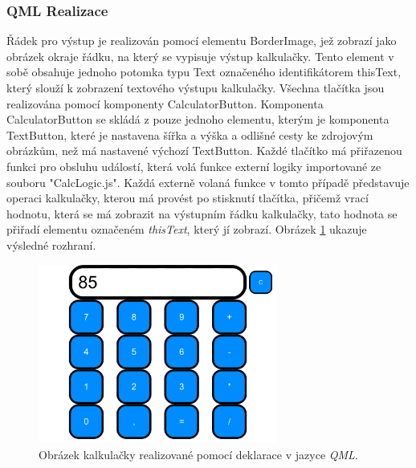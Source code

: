 \documentclass[11pt,twoside,a4paper]{book}
\begin{document}
{{\begin{ttemize}
{{\begin{lastlisting}[frame=single,caption=Řešení v pseudokódu problematického použití operátoru "." v přiřazovacím výroku,label=lst:var0N]
\subsubsection{QML Realizace}
Řádek pro výstup je realizován pomocí elementu BorderImage, jež zobrazí jako obrázek okraje řádku, na který se vypisuje výstup kalkulačky. Tento element v sobě obsahuje jednoho potomka typu Text označeného identifikátorem thisText, který slouží k zobrazení textového výstupu kalkulačky.
Všechna tlačítka jsou realizována pomocí komponenty CalculatorButton.  Komponenta CalculatorButton se skládá z pouze jednoho elementu, kterým je komponenta TextButton, které je nastavena šířka a výška a odlišné cesty ke zdrojovým obrázkům, než má nastavené výchozí TextButton. Každé tlačítko má přiřazenou funkci pro obsluhu událostí, která volá funkce externí logiky importované ze souboru "CalcLogic.js". Každá externě volaná funkce v tomto případě představuje operaci kalkulačky, kterou má provést po stisknutí tlačítka, přičemž vrací hodnotu, která se má zobrazit na výstupním řádku kalkulačky, tato hodnota se přiřadí elementu označeném \textit{thisText}, který jí zobrazí. Obrázek \ref{fig:outCalcQML} ukazuje výsledné rozhraní.
\begin{figure}[!ht]
\begin{center}
  \includegraphics[width=0.7\textwidth]{qmlCalc}
\caption{{\label{fig:outCalcQML}}Obrázek kalkulačky realizované pomocí deklarace v jazyce \textit{QML}.}
\end{center}
\end{figure}


\end{lastlisting}}}
\end{ttemize}}}
\end{document}
